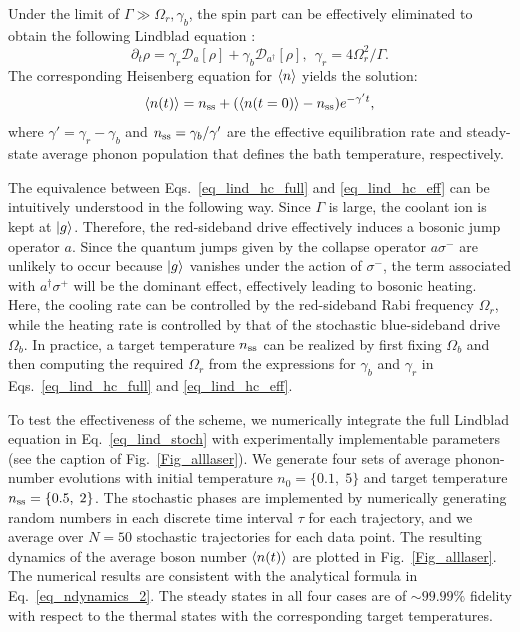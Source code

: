 \documentclass[
reprint,
superscriptaddress,

amsmath,amssymb,
aps,
prl,

floatfix,
]{revtex4-2}
\begin{document}
Under the limit of $\Gamma\gg \Omega_r,\gamma_b$, the spin part can be effectively eliminated to obtain the following Lindblad equation \cite{kienzler2015thesis}:
\begin{equation}
\partial_t\rho=\gamma_r\mathcal{D}_a\left[\rho\right]+\gamma_b\mathcal{D}_{a^\dagger}\left[\rho\right], \:\: \gamma_r=4\Omega_r^2/\Gamma.
\label{eq_lind_hc_eff}
\end{equation}
The corresponding Heisenberg equation for $\braket{n}$ yields the solution:
\begin{equation}
    \braket{n(t)}=n_{\rm ss}+(\braket{n(t=0)}-n_{\rm ss})e^{-\gamma't},
    \label{eq_ndynamics_2}
\end{equation}
where $\gamma'=\gamma_r-\gamma_b$ and $n_{\rm ss}=\gamma_b/\gamma'$ are the effective equilibration rate and steady-state average phonon population that defines the bath temperature, respectively.

The equivalence between Eqs.~\eqref{eq_lind_hc_full} and \eqref{eq_lind_hc_eff} can be intuitively understood in the following way. Since $\Gamma$ is large, the coolant ion is kept at $\ket{g}$. Therefore, the red-sideband drive effectively induces a bosonic jump operator $a$. Since the quantum jumps given by the collapse operator $a\sigma^-$ are unlikely to occur because $\ket{g}$ vanishes under the action of $\sigma^-$, the term associated with $a^\dagger\sigma^+$ will be the dominant effect, effectively leading to bosonic heating. Here, the cooling rate can be controlled by the red-sideband Rabi frequency $\Omega_r$, while the heating rate is controlled by that of the stochastic blue-sideband drive $\Omega_b$. In practice, a target temperature $n_{\rm ss}$ can be realized by first fixing $\Omega_b$ and then computing the required $\Omega_r$ from the expressions for $\gamma_b$ and $\gamma_r$ in Eqs.~\eqref{eq_lind_hc_full} and  \eqref{eq_lind_hc_eff}.

To test the effectiveness of the scheme, we numerically integrate the full Lindblad equation in Eq.~\eqref{eq_lind_stoch} with experimentally implementable parameters (see the caption of Fig.~\ref{Fig_alllaser}). We generate four sets of average phonon-number evolutions with initial temperature $n_0=\{0.1,\;5\}$ and target temperature $n_{\rm ss}=\{0.5,\;2\}$. The stochastic phases are implemented by numerically generating random numbers in each discrete time interval $\tau$ for each trajectory, and we average over $N=50$ stochastic trajectories for each data point. The resulting dynamics of the average boson number $\braket{n(t)}$ are plotted in Fig.~\ref{Fig_alllaser}. The numerical results are consistent with the analytical formula in Eq.~\eqref{eq_ndynamics_2}. The steady states in all four cases are of $\sim 99.99\%$ fidelity with respect to the thermal states with the corresponding target temperatures.
\end{document}
